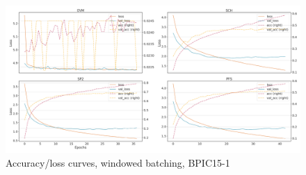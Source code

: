 \begin{figure}[!htb]
    \centering
    \includegraphics[width=\textwidth]{gfx/bpic2015_1/windowed_loss_acc_curve.png}
    \caption{Accuracy/loss curves, windowed batching, BPIC15-1}
\end{figure}
\FloatBarrier


